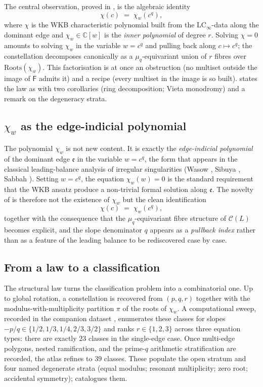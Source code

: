\documentclass[aip,jmp,preprint,amsmath,amssymb,nofootinbib,floatfix]{revtex4-2}
\theoremstyle{plain}
\theoremstyle{definition}
\theoremstyle{remark}
\newcommand{\LCinf}{\mathrm{LC}_\infty}
\newcommand{\Roots}{\mathrm{Roots}}
\newcommand{\Cl}{\mathcal{C}}
\newcommand{\Fclass}{\mathsf{F}}
\begin{document}
The central observation, proved in , is the algebraic
identity
\[
   \chi(c) \;=\; \chi_w(c^q),
\]
where $\chi$ is the WKB characteristic polynomial built from the
$\LCinf$-data along the dominant edge and $\chi_w \in \mathbb{C}[w]$
is the \emph{inner polynomial} of degree $r$. Solving $\chi = 0$
amounts to solving $\chi_w$ in the variable $w = c^q$ and pulling
back along $c \mapsto c^q$; the constellation decomposes canonically
as a $\mu_q$-equivariant union of $r$ fibres over $\Roots(\chi_w)$.
This factorisation is at once an obstruction (no multiset outside the
image of $\Fclass$ admits it) and a recipe (every multiset in the
image is so built).  states the law as
 with two corollaries (ring decomposition; Vieta
monodromy) and a remark on the degeneracy strata.

\subsection{$\chi_w$ as the edge-indicial polynomial}
\label{ssec:intro-chi-w}

The polynomial $\chi_w$ is not new content. It is exactly the
\emph{edge-indicial polynomial} of the dominant edge $\mathfrak{e}$
in the variable $w = c^q$, the form that appears in the classical
leading-balance analysis of irregular singularities (Wasow
\cite{wasow}, Sibuya \cite{sibuya}, Sabbah
\cite{sabbah-isomon}). Setting $w = c^q$, the equation $\chi_w(w) = 0$
is the standard requirement that the WKB ansatz produce a
non-trivial formal solution along $\mathfrak{e}$. The novelty of
 is therefore not the existence of $\chi_w$ but the
clean identification
\[
   \chi(c) \;=\; \chi_w(c^q),
\]
together with the consequence that the $\mu_q$-equivariant fibre
structure of $\Cl(L)$ becomes explicit, and the slope denominator $q$
appears as a \emph{pullback index} rather than as a feature of the
leading balance to be rediscovered case by case.

\subsection{From a law to a classification}
\label{ssec:intro-classification}

The structural law turns the classification problem into a
combinatorial one. Up to global rotation, a constellation is recovered
from $(p, q, r)$ together with the modulus-with-multiplicity partition
$\pi$ of the roots of $\chi_w$. A computational sweep, recorded in the
companion dataset \cite{wkb_dataset_v1}, enumerates these classes for
slopes $-p/q \in \{1/2, 1/3, 1/4, 2/3, 3/2\}$ and ranks $r \in
\{1, 2, 3\}$ across three equation types: there are exactly $23$
classes in the single-edge case. Once multi-edge polygons, nested
ramification, and the prime-$q$ arithmetic stratification are recorded,
the atlas refines to $39$ classes. These populate the open stratum
and four named degenerate strata (equal modulus; resonant multiplicity;
zero root; accidental symmetry);  catalogues them.
\end{document}
